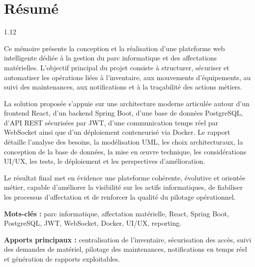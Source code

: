 ﻿\documentclass[12pt,a4paper,oneside]{report}
\newcommand{\frontmatterchapter}[1]{
  \chapter*{#1}
  \addcontentsline{toc}{chapter}{#1}
}
\newenvironment{frontmattertext}{
  \begin{spacing}{1.12}
  \normalsize
  \setlength{\parskip}{0.45em}
}{
  \end{spacing}
}
\begin{document}
\frontmatterchapter{Résumé}
\begin{frontmattertext}
Ce mémoire présente la conception et la réalisation d'une plateforme web intelligente dédiée à la gestion du parc informatique et des affectations matérielles. L'objectif principal du projet consiste à structurer, sécuriser et automatiser les opérations liées à l'inventaire, aux mouvements d'équipements, au suivi des maintenances, aux notifications et à la traçabilité des actions métiers.

La solution proposée s'appuie sur une architecture moderne articulée autour d'un frontend React, d'un backend Spring Boot, d'une base de données PostgreSQL, d'API REST sécurisées par JWT, d'une communication temps réel par WebSocket ainsi que d'un déploiement conteneurisé via Docker. Le rapport détaille l'analyse des besoins, la modélisation UML, les choix architecturaux, la conception de la base de données, la mise en œuvre technique, les considérations UI/UX, les tests, le déploiement et les perspectives d'amélioration.

Le résultat final met en évidence une plateforme cohérente, évolutive et orientée métier, capable d'améliorer la visibilité sur les actifs informatiques, de fiabiliser les processus d'affectation et de renforcer la qualité du pilotage opérationnel.

\textbf{Mots-clés :} parc informatique, affectation matérielle, React, Spring Boot, PostgreSQL, JWT, WebSocket, Docker, UI/UX, reporting.

\textbf{Apports principaux :} centralisation de l'inventaire, sécurisation des accès, suivi des demandes de matériel, pilotage des maintenances, notifications en temps réel et génération de rapports exploitables.
\end{frontmattertext}
\end{document}
